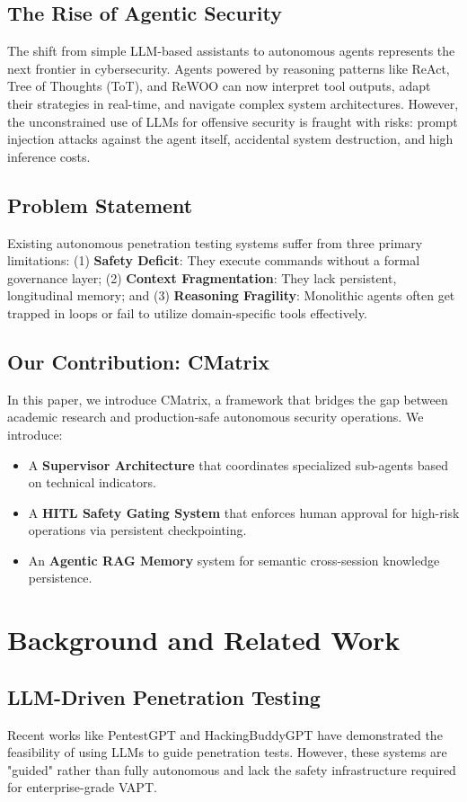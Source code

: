 \documentclass[conference,compsoc]{IEEEtran}
\begin{document}
\subsection{The Rise of Agentic Security}
The shift from simple LLM-based assistants to autonomous agents represents the next frontier in cybersecurity. Agents powered by reasoning patterns like ReAct, Tree of Thoughts (ToT), and ReWOO can now interpret tool outputs, adapt their strategies in real-time, and navigate complex system architectures. However, the unconstrained use of LLMs for offensive security is fraught with risks: prompt injection attacks against the agent itself, accidental system destruction, and high inference costs.

\subsection{Problem Statement}
Existing autonomous penetration testing systems suffer from three primary limitations: (1) \textbf{Safety Deficit}: They execute commands without a formal governance layer; (2) \textbf{Context Fragmentation}: They lack persistent, longitudinal memory; and (3) \textbf{Reasoning Fragility}: Monolithic agents often get trapped in loops or fail to utilize domain-specific tools effectively.

\subsection{Our Contribution: CMatrix}
In this paper, we introduce CMatrix, a framework that bridges the gap between academic research and production-safe autonomous security operations. We introduce:
\begin{itemize}
    \item A \textbf{Supervisor Architecture} that coordinates specialized sub-agents based on technical indicators.
    \item A \textbf{HITL Safety Gating System} that enforces human approval for high-risk operations via persistent checkpointing.
    \item An \textbf{Agentic RAG Memory} system for semantic cross-session knowledge persistence.
\end{itemize}

\section{Background and Related Work}
\subsection{LLM-Driven Penetration Testing}
Recent works like PentestGPT \cite{pentestgpt} and HackingBuddyGPT \cite{hackingbuddygpt} have demonstrated the feasibility of using LLMs to guide penetration tests. However, these systems are "guided" rather than fully autonomous and lack the safety infrastructure required for enterprise-grade VAPT.
\end{document}
